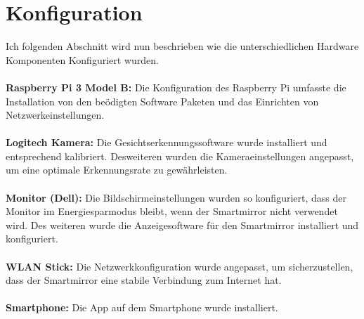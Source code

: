 \section{Konfiguration}
Ich folgenden Abschnitt wird nun beschrieben wie die unterschiedlichen Hardware Komponenten Konfiguriert wurden. \\ \\
\noindent
\textbf{Raspberry Pi 3 Model B:}
Die Konfiguration des Raspberry Pi umfasste die Installation von den beödigten Software Paketen und das Einrichten von Netzwerkeinstellungen. \\ \\
\noindent
\textbf{Logitech Kamera:}
Die Gesichtserkennungssoftware wurde installiert und entsprechend kalibriert. Desweiteren wurden die Kameraeinstellungen angepasst, um eine optimale Erkennungsrate zu gewährleisten. \\ \\
\noindent
\textbf{Monitor (Dell):}
Die Bildschirmeinstellungen wurden so konfiguriert, dass der Monitor im Energiesparmodus bleibt, wenn der Smartmirror nicht verwendet wird. Des weiteren wurde die Anzeigesoftware für den Smartmirror installiert und konfiguriert. \\ \\
\noindent
\textbf{WLAN Stick:}
Die Netzwerkkonfiguration wurde angepasst, um sicherzustellen, dass der Smartmirror eine stabile Verbindung zum Internet hat. \\ \\
\noindent
\textbf{Smartphone:}
Die App auf dem Smartphone wurde installiert. \\ \\
\noindent

